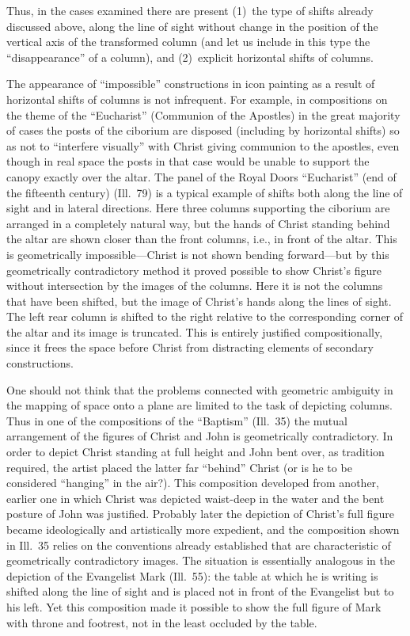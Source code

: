 Thus, in the cases examined there are present (1)~the type of shifts already discussed
above, along the line of sight without change in the position of the vertical axis of the
transformed column (and let us include in this type the ``disappearance'' of a column),
and (2)~explicit horizontal shifts of columns.

The appearance of ``impossible'' constructions in icon painting as a result of horizontal
shifts of columns is not infrequent.  For example, in compositions on the theme of the
``Eucharist'' (Communion of the Apostles) in the great majority of cases the posts of
the ciborium are disposed (including by horizontal shifts) so as not to ``interfere
visually'' with Christ giving communion to the apostles, even though in real space the
posts in that case would be unable to support the canopy exactly over the altar.  The
panel of the Royal Doors ``Eucharist'' (end of the fifteenth century) (Ill.~79) is a
typical example of shifts both along the line of sight and in lateral directions.  Here
three columns supporting the ciborium are arranged in a completely natural way, but the
hands of Christ standing behind the altar are shown closer than the front columns, i.e.,
in front of the altar.  This is geometrically impossible---Christ is not shown bending
forward---but by this geometrically contradictory method it proved possible to show
Christ's figure without intersection by the images of the columns.  Here it is not the
columns that have been shifted, but the image of Christ's hands along the lines of sight.
The left rear column is shifted to the right relative to the corresponding corner of the
altar and its image is truncated.  This is entirely justified compositionally, since it
frees the space before Christ from distracting elements of secondary constructions.


One should not think that the problems connected with geometric ambiguity in the mapping
of space onto a plane are limited to the task of depicting columns.  Thus in one of the
compositions of the ``Baptism'' (Ill.~35) the mutual arrangement of the figures of Christ
and John is geometrically contradictory.  In order to depict Christ standing at full
height and John bent over, as tradition required, the artist placed the latter far
``behind'' Christ (or is he to be considered ``hanging'' in the air?).  This composition
developed from another, earlier one in which Christ was depicted waist-deep in the water
and the bent posture of John was justified.  Probably later the depiction of Christ's
full figure became ideologically and artistically more expedient, and the composition
shown in Ill.~35 relies on the conventions already established that are characteristic
of geometrically contradictory images.  The situation is essentially analogous in the
depiction of the Evangelist Mark (Ill.~55): the table at which he is writing is shifted
along the line of sight and is placed not in front of the Evangelist but to his left.
Yet this composition made it possible to show the full figure of Mark with throne and
footrest, not in the least occluded by the table.

